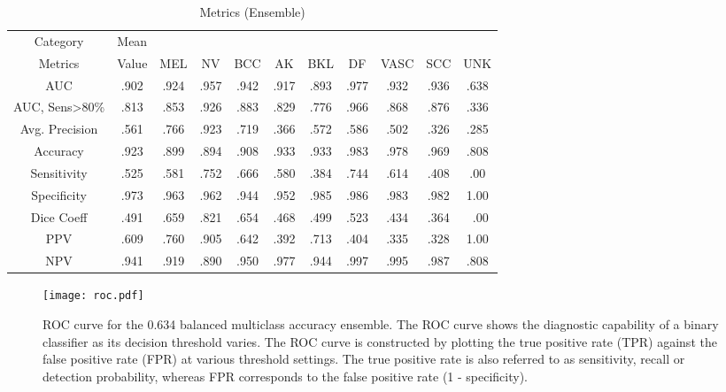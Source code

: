 \documentclass[journal]{IEEEtran}
\begin{document}
\begin{table}
\caption{Metrics (Ensemble)}
\label{table_metrics}
\centering
\tabcolsep=0.052cm
\begin{tabular}{cc|ccccccccc}
Category & Mean \\
Metrics & Value & MEL & NV & BCC & AK & BKL & DF & VASC & SCC & UNK \\
\hline
AUC & .902 & .924 &	.957 &	.942 & .917 & .893 &	.977 &	.932 &	.936 &	.638 \\
AUC, Sens\textgreater80\% & .813 &	.853 &	.926 &	.883 &	.829 &	.776 &	.966 &	.868 &	.876 &	.336 \\
Avg. Precision
&.561 	&.766 	&.923 	&.719 	&.366 	&.572 	&.586 	&.502 	&.326 	&.285\\
Accuracy 	&.923 	&.899 	&.894 	&.908 	&.933 	&.933 	&.983 	&.978 	&.969 	&.808\\
Sensitivity
&.525 	&.581 	&.752 	&.666 	&.580 	&.384 	&.744 	&.614 	&.408 	& .00\\
Specificity 	&.973 	&.963 	&.962 	&.944 	&.952 	&.985 	&.986 	&.983 	&.982 &	1.00\\
Dice Coeff
&.491 	&.659 	&.821 	&.654 	&.468 	&.499 	&.523 	&.434 	&.364 	&\ .00\\
PPV
&.609 	&.760 	&.905 	&.642 	&.392 	&.713 	&.404 	&.335 	&.328 	& 1.00\\
NPV
&.941 	&.919 	&.890 	&.950 	&.977 	&.944 	&.997 	&.995 	&.987 	&.808 \\
\end{tabular}
\end{table}


\begin{figure}[t!]
\centering
\texttt{[image: roc.pdf]}
\caption{ROC curve for the  0.634 balanced multiclass accuracy ensemble. The ROC curve shows the diagnostic capability of a binary classifier as its decision threshold varies. The ROC curve is constructed by plotting the true positive rate (TPR) against the false positive rate (FPR) at various threshold settings. The true positive rate is also referred to as sensitivity, recall or detection probability, whereas FPR corresponds to the false positive rate (1 - specificity).}
\label{roc}
\end{figure}
\end{document}
